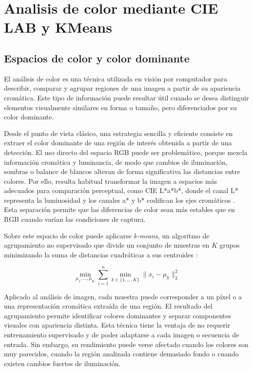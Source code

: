 \section{Analisis de color mediante CIE LAB y KMeans}
\subsection{Espacios de color y color dominante}
El análisis de color es una técnica utilizada en visión por computador para describir, comparar y agrupar regiones de una imagen a partir de su apariencia cromática. Este tipo de información puede resultar útil cuando se desea distinguir elementos visualmente similares en forma o tamaño, pero diferenciados por su color dominante.

Desde el punto de vista clásico, una estrategia sencilla y eficiente consiste en extraer el color dominante de una región de interés obtenida a partir de una detección. El uso directo del espacio RGB puede ser problemático, porque mezcla información cromática y luminancia, de modo que cambios de iluminación, sombras o balance de blancos alteran de forma significativa las distancias entre colores. Por ello, resulta habitual transformar la imagen a espacios más adecuados para comparación perceptual, como CIE L*a*b*, donde el canal L* representa la luminosidad y los canales a* y b* codifican los ejes cromáticos \citep{cie1976lab}. Esta separación permite que las diferencias de color sean más estables que en RGB cuando varían las condiciones de captura.

Sobre este espacio de color puede aplicarse \textit{k-means}, un algoritmo de agrupamiento no supervisado que divide un conjunto de muestras en $K$ grupos minimizando la suma de distancias cuadráticas a sus centroides \citep{macqueen1967kmeans,lloyd1982least}:

\[
\min_{\mu_1,\dots,\mu_K} \sum_{i=1}^{n} \min_{k \in \{1,\dots,K\}} \|x_i - \mu_k\|_2^2
\]

Aplicado al análisis de imagen, cada muestra puede corresponder a un píxel o a una representación cromática extraída de una región. El resultado del agrupamiento permite identificar colores dominantes y separar componentes visuales con apariencia distinta. Esta técnica tiene la ventaja de no requerir entrenamiento supervisado y de poder adaptarse a cada imagen o secuencia de entrada. Sin embargo, su rendimiento puede verse afectado cuando los colores son muy parecidos, cuando la región analizada contiene demasiado fondo o cuando existen cambios fuertes de iluminación.

